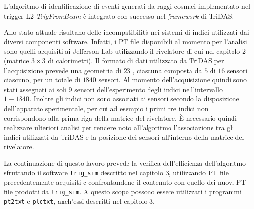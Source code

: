 \documentclass[../main.tex]{subfiles}
\begin{document}
L'algoritmo di identificazione di eventi generati da raggi cosmici implementato nel trigger L2 \emph{TrigFromBeam} è integrato con successo nel \emph{framework} di TriDAS. 

Allo stato attuale risultano delle incompatibilità nei sistemi di indici utilizzati dai diversi componenti software. 
Infatti, i PT file disponibili al momento per l'analisi sono quelli acquisiti ai Jefferson Lab utilizzando il rivelatore di cui nel capitolo 2 (matrice $3 \times 3$ di calorimetri). Il formato di dati utilizzato da TriDAS per l'acquisizione prevede una geometria di $23$ , ciascuna composta da $5$  di $16$ sensori ciascuno, per un totale di $1840$ sensori. Al momento dell'acquisizione quindi sono stati assegnati ai soli $9$ sensori dell'esperimento degli indici nell'intervallo $1 - 1840$. Inoltre gli indici non sono associati ai sensori secondo la disposizione dell'apparato sperimentale, per cui ad esempio i primi tre indici non corrispondono alla prima riga della matrice del rivelatore. 
È necessario quindi realizzare ulteriori analisi per rendere noto all'algoritmo l'associazione tra gli indici utilizzati da TriDAS e la posizione dei sensori all'interno della matrice del rivelatore. 

La continuazione di questo lavoro prevede la verifica dell'efficienza dell'algoritmo sfruttando il software \texttt{trig\_sim} descritto nel capitolo 3, utilizzando PT file precedentemente acquisiti e confrontandone il contenuto con quello dei nuovi PT file prodotti da \texttt{trig\_sim}.
A questo scopo possono essere utilizzati i programmi \texttt{pt2txt} e \texttt{plotxt}, anch'essi descritti nel capitolo 3.
\end{document}

